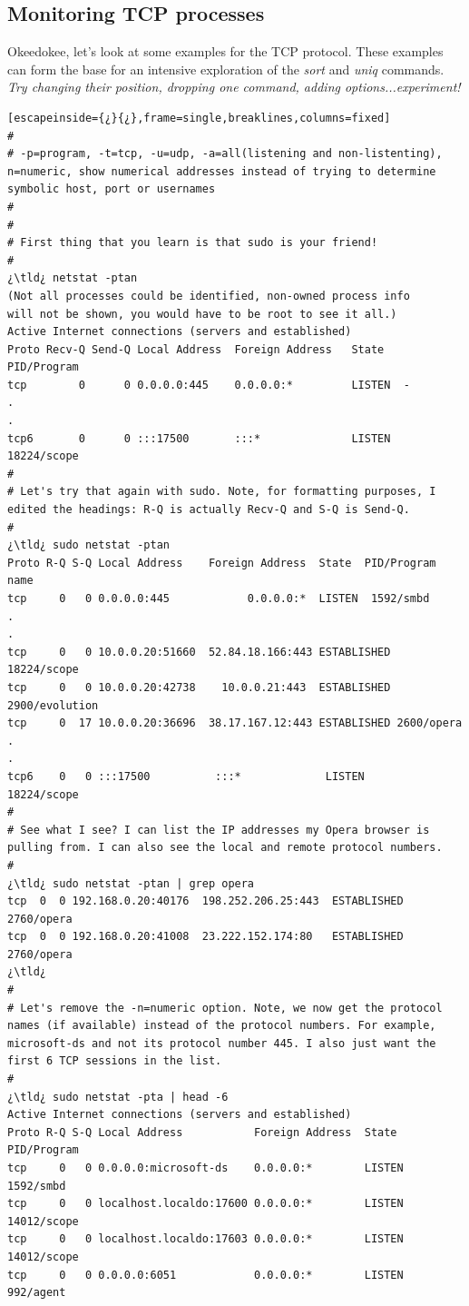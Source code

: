 \subsection{Monitoring TCP processes}

Okeedokee, let's look at some  examples for the TCP protocol. These examples can form the base for an intensive exploration of the \emph{sort} and \emph{uniq} commands. \textit{Try changing their position, dropping one command, adding options...experiment!}

\begin{lstlisting}[escapeinside={¿}{¿},frame=single,breaklines,columns=fixed]
#
# -p=program, -t=tcp, -u=udp, -a=all(listening and non-listenting), n=numeric, show numerical addresses instead of trying to determine symbolic host, port or usernames
#	
#
# First thing that you learn is that sudo is your friend!
#
¿\tld¿ netstat -ptan
(Not all processes could be identified, non-owned process info
will not be shown, you would have to be root to see it all.)
Active Internet connections (servers and established)
Proto Recv-Q Send-Q Local Address  Foreign Address   State   PID/Program   
tcp        0      0 0.0.0.0:445    0.0.0.0:*         LISTEN  -                 
.
.
tcp6       0      0 :::17500       :::*              LISTEN   18224/scope 
#
# Let's try that again with sudo. Note, for formatting purposes, I edited the headings: R-Q is actually Recv-Q and S-Q is Send-Q.
#
¿\tld¿ sudo netstat -ptan
Proto R-Q S-Q Local Address    Foreign Address  State  PID/Program name   
tcp     0   0 0.0.0.0:445            0.0.0.0:*  LISTEN  1592/smbd 
.
.
tcp     0   0 10.0.0.20:51660  52.84.18.166:443 ESTABLISHED 18224/scope       
tcp     0   0 10.0.0.20:42738    10.0.0.21:443  ESTABLISHED 2900/evolution      
tcp     0  17 10.0.0.20:36696  38.17.167.12:443 ESTABLISHED 2600/opera             
.
.
tcp6    0   0 :::17500          :::*             LISTEN      18224/scope 
#
# See what I see? I can list the IP addresses my Opera browser is pulling from. I can also see the local and remote protocol numbers.
#
¿\tld¿ sudo netstat -ptan | grep opera
tcp  0  0 192.168.0.20:40176  198.252.206.25:443  ESTABLISHED 2760/opera          
tcp  0  0 192.168.0.20:41008  23.222.152.174:80   ESTABLISHED 2760/opera          
¿\tld¿ 
#
# Let's remove the -n=numeric option. Note, we now get the protocol names (if available) instead of the protocol numbers. For example, microsoft-ds and not its protocol number 445. I also just want the first 6 TCP sessions in the list.
#       
¿\tld¿ sudo netstat -pta | head -6
Active Internet connections (servers and established)
Proto R-Q S-Q Local Address           Foreign Address  State   PID/Program    
tcp     0   0 0.0.0.0:microsoft-ds    0.0.0.0:*        LISTEN  1592/smbd           
tcp     0   0 localhost.localdo:17600 0.0.0.0:*        LISTEN  14012/scope      
tcp     0   0 localhost.localdo:17603 0.0.0.0:*        LISTEN  14012/scope       
tcp     0   0 0.0.0.0:6051            0.0.0.0:*        LISTEN  992/agent       


\end{lstlisting}
